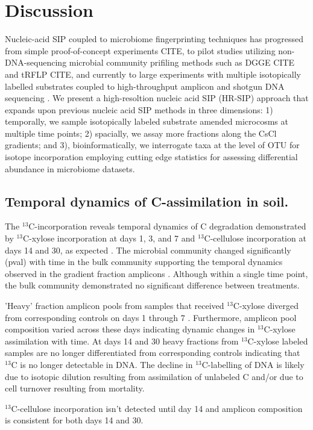 \section{Discussion}
Nucleic-acid SIP coupled to microbiome fingerprinting techniques has progressed
from simple proof-of-concept experiments  CITE, to pilot studies utilizing
non-DNA-sequencing microbial community prifiling methods such as DGGE CITE and
tRFLP CITE, and currently to large experiments with multiple isotopically 
labelled substrates coupled to high-throughput amplicon and 
shotgun DNA sequencing \citep{Verastegui_2014}. We present a high-resoltion 
nucleic acid SIP (HR-SIP) 
approach that expands upon previous nucleic acid SIP methods in three dimensions:
1) temporally, we sample isotopically labeled substrate amended microcosms at multiple 
time points; 2) spacially, we assay more fractions along the CsCl gradients; and 3), 
bioinformatically, we interrogate taxa at the level of OTU for isotope incorporation
employing cutting edge statistics for assessing differential abundance in microbiome
datasets.

\subsection{Temporal dynamics of C-assimilation in soil.}  
The $^{13}$C-incorporation reveals temporal dynamics of C degradation
demonstrated by $^{13}$C-xylose incorporation at days 1, 3, and 7 and
$^{13}$C-cellulose incorporation at days 14 and 30, as expected
\citep{Amelung_2008}. The microbial community changed significantly (pval) with
time in the bulk community supporting the temporal dynamics observed in the
gradient fraction amplicons . Although within a single time point, the bulk
community demonstrated no significant difference between treatments. 

'Heavy' fraction amplicon pools from samples that received $^{13}$C-xylose
diverged from corresponding controls on days 1 through 7 . Furthermore,
amplicon pool composition varied across these days indicating dynamic changes
in $^{13}$C-xylose assimilation with time. At days 14 and 30 heavy fractions
from $^{13}$C-xylose labeled samples are no longer differentiated from
corresponding controls indicating that $^{13}$C is no longer detectable in DNA.
The decline in $^{13}$C-labelling of DNA is likely due to isotopic dilution
resulting from assimilation of unlabeled C and/or due to cell turnover
resulting from mortality. 

$^{13}$C-cellulose incorporation isn't detected until day 14 and amplicon
composition is consistent for both days 14 and 30.

